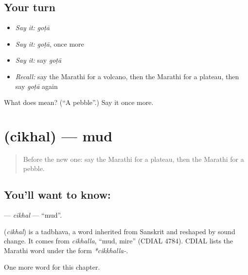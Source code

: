 \subsection*{Your turn}
\begin{itemize}
\raggedright
  \item \emph{Say it:} \emph{goṭā}
  \item \emph{Say it:} \emph{goṭā}, once more
  \item \emph{Say it:} say \emph{goṭā}
  \item \emph{Recall:} say the Marathi for a volcano, then the Marathi for a plateau, then say \emph{goṭā} again
\end{itemize}

\begin{tcolorbox}[breakable,colback=teal!4,colframe=teal!35!black,title={Before you move on}]
What does  mean? (\textquotedblleft{}A pebble\textquotedblright{}.) Say it once more.
\end{tcolorbox}
\section[\texorpdfstring{\mr{चिखल} (cikhal)}{चिखल (cikhal)}]{ (cikhal) — mud}

\label{lesson:MR-C267-cikhal}



\begin{quote}
Before the new one: say the Marathi for a plateau, then the Marathi for a pebble.
\end{quote}

\subsection*{You'll want to know: }
\textbf{} — \emph{cikhal} — \textquotedblleft{}mud\textquotedblright{}.

\begin{cousinweb}
\textbf{} (\emph{cikhal}) is a tadbhava, a word inherited from Sanskrit and reshaped by sound change. It comes from \emph{cikhalla}, \textquotedblleft{}mud, mire\textquotedblright{} (CDIAL 4784). CDIAL lists the Marathi word under the form \emph{*cikkhalla-}.
\end{cousinweb}

\begin{grammarlens}[title={What you've built}]
One more word for this chapter.
\end{grammarlens}

